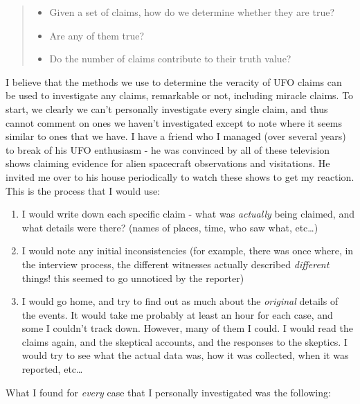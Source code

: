 \documentclass{tufte-book}
\begin{document}
\begin{quote}
\begin{itemize}
\itemsep1pt\parskip0pt
\item
  Given a set of claims, how do we determine whether they are true?
\item
  Are any of them true?
\item
  Do the number of claims contribute to their truth value?
\end{itemize}
\end{quote}

I believe that the methods we use to determine the veracity of UFO
claims can be used to investigate any claims, remarkable or not,
including miracle claims. To start, we clearly we can't personally
investigate every single claim, and thus cannot comment on ones we
haven't investigated except to note where it seems similar to ones that
we have. I have a friend who I managed (over several years) to break of
his UFO enthusiasm - he was convinced by all of these television shows
claiming evidence for alien spacecraft observations and visitations. He
invited me over to his house periodically to watch these shows to get my
reaction. This is the process that I would use:

\begin{enumerate}
\def\labelenumi{\arabic{enumi}.}
\itemsep1pt\parskip0pt
\item
  I would write down each specific claim - what was \emph{actually}
  being claimed, and what details were there? (names of places, time,
  who saw what, etc\ldots{})
\item
  I would note any initial inconsistencies (for example, there was once
  where, in the interview process, the different witnesses actually
  described \emph{different} things! this seemed to go unnoticed by the
  reporter)
\item
  I would go home, and try to find out as much about the \emph{original}
  details of the events. It would take me probably at least an hour for
  each case, and some I couldn't track down. However, many of them I
  could. I would read the claims again, and the skeptical accounts, and
  the responses to the skeptics. I would try to see what the actual data
  was, how it was collected, when it was reported, etc\ldots{}
\end{enumerate}

What I found for \emph{every} case that I personally investigated was
the following:
\end{document}
